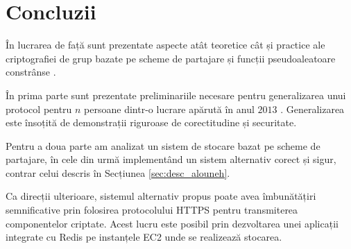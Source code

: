 \documentclass[oneside, 12pt]{book}
\begin{document}
\chapter{Concluzii}

În lucrarea de față sunt prezentate aspecte atât teoretice cât și practice ale criptografiei de grup bazate pe scheme de partajare și funcții pseudoaleatoare constrânse \cite{S:1979, boneh:2013constrained}.

În prima parte sunt prezentate preliminariile necesare pentru generalizarea unui protocol pentru $n$ persoane dintr-o lucrare apărută în anul $2013$ \cite{boneh:2013constrained}. Generalizarea este însoțită de demonstrații riguroase de corectitudine și securitate.

Pentru a doua parte am analizat un sistem de stocare bazat pe scheme de partajare, în cele din urmă implementând un sistem alternativ corect și sigur, contrar celui descris în Secțiunea \ref{sec:desc_alouneh}.

Ca direcții ulterioare, sistemul alternativ propus poate avea îmbunătățiri semnificative prin folosirea protocolului HTTPS pentru transmiterea componentelor criptate. Acest lucru este posibil prin dezvoltarea unei aplicații integrate cu Redis pe instanțele EC2 unde se realizează stocarea.



\clearpage



\end{document}

